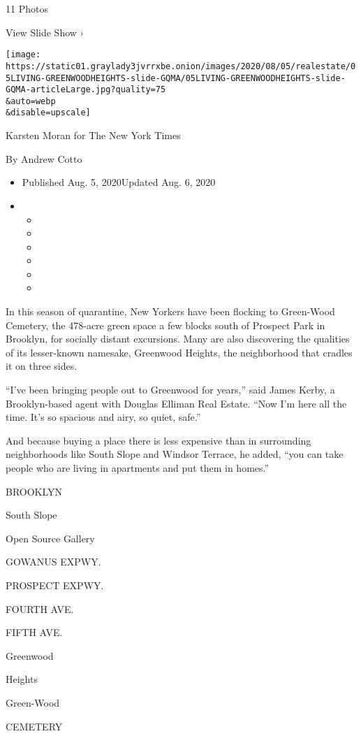 11 Photos

View Slide Show ›

\texttt{[image: https://static01.graylady3jvrrxbe.onion/images/2020/08/05/realestate/05LIVING-GREENWOODHEIGHTS-slide-GQMA/05LIVING-GREENWOODHEIGHTS-slide-GQMA-articleLarge.jpg?quality=75\\\&auto=webp\\\&disable=upscale]}

Karsten Moran for The New York Times

By Andrew Cotto

\begin{itemize}
\item
  Published Aug. 5, 2020Updated Aug. 6, 2020
\item
  \begin{itemize}
  \item
  \item
  \item
  \item
  \item
  \item
  \end{itemize}
\end{itemize}

In this season of quarantine, New Yorkers have been flocking to
Green-Wood Cemetery, the 478-acre green space a few blocks south of
Prospect Park in Brooklyn, for socially distant excursions. Many are
also discovering the qualities of its lesser-known namesake, Greenwood
Heights, the neighborhood that cradles it on three sides.

``I've been bringing people out to Greenwood for years,'' said James
Kerby, a Brooklyn-based agent with Douglas Elliman Real Estate. ``Now
I'm here all the time. It's so spacious and airy, so quiet, safe.''

And because buying a place there is less expensive than in surrounding
neighborhoods like South Slope and Windsor Terrace, he added, ``you can
take people who are living in apartments and put them in homes.''

BROOKLYN

South Slope

Open Source Gallery

GOWANUS EXPWY.

PROSPECT EXPWY.

FOURTH AVE.

FIFTH AVE.

Greenwood

Heights

Green-Wood

CEMETERY

